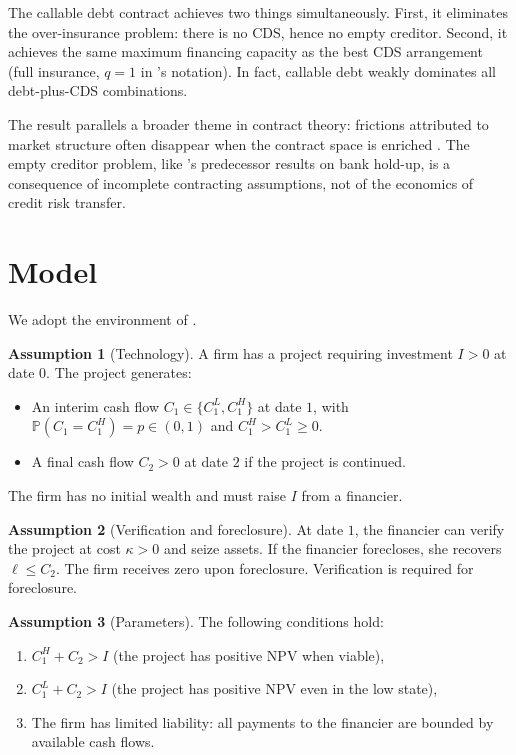 \documentclass[12pt,a4paper]{article}
\theoremstyle{plain}
\theoremstyle{definition}
\newtheorem{assumption}{Assumption}
\theoremstyle{remark}
\newcommand{\Prob}{\mathbb{P}}
\begin{document}
The callable debt contract achieves two things simultaneously. First, it eliminates the over-insurance problem: there is no CDS, hence no empty creditor. Second, it achieves the same maximum financing capacity as the best CDS arrangement (full insurance, $q = 1$ in \citeauthor{boltonoehmke2011}'s notation). In fact, callable debt weakly dominates all debt-plus-CDS combinations.

The result parallels a broader theme in contract theory: frictions attributed to market structure often disappear when the contract space is enriched \citep{aghionbolton1992, hart1998}. The empty creditor problem, like \citeauthor{boltonoehmke2011}'s predecessor results on bank hold-up, is a consequence of incomplete contracting assumptions, not of the economics of credit risk transfer.

\section{Model}

We adopt the environment of \citet{boltonoehmke2011}.

\begin{assumption}[Technology]\label{a:tech}
A firm has a project requiring investment $I > 0$ at date $0$. The project generates:
\begin{itemize}[nosep]
\item An interim cash flow $C_1 \in \{C_1^L, C_1^H\}$ at date $1$, with $\Prob(C_1 = C_1^H) = p \in (0,1)$ and $C_1^H > C_1^L \geq 0$.
\item A final cash flow $C_2 > 0$ at date $2$ if the project is continued.
\end{itemize}
The firm has no initial wealth and must raise $I$ from a financier.
\end{assumption}

\begin{assumption}[Verification and foreclosure]\label{a:verify}
At date $1$, the financier can verify the project at cost $\kappa > 0$ and seize assets. If the financier forecloses, she recovers $\ell \leq C_2$. The firm receives zero upon foreclosure. Verification is required for foreclosure.
\end{assumption}

\begin{assumption}[Parameters]\label{a:param}
The following conditions hold:
\begin{enumerate}[nosep,label=(\roman*)]
\item $C_1^H + C_2 > I$ \quad (the project has positive NPV when viable),
\item $C_1^L + C_2 > I$ \quad (the project has positive NPV even in the low state),
\item The firm has limited liability: all payments to the financier are bounded by available cash flows.
\end{enumerate}
\end{assumption}
\end{document}
